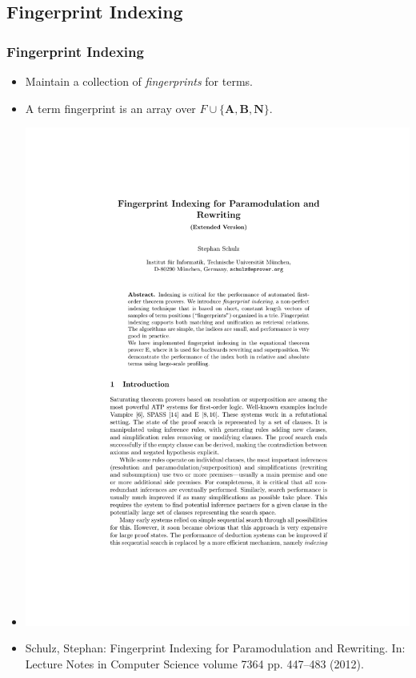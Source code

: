\documentclass[10pt]{beamer}
\begin{document}
\begin{NoHyper}
\subsection{Fingerprint Indexing} 
\begin{frame}
  \frametitle{Fingerprint Indexing}
  \begin{itemize}
  \item<1-> Maintain a collection of \emph{fingerprints} for terms.
  \item<2-> A term fingerprint is an array over $F \cup \{\mathbf{A, B, N}\}$.
  \item<3-> \includegraphics[page=6,scale=0.7,trim=5.5cm 20.5cm 5cm 4cm,clip]{schulz_fp-index_ext}
  \item<4-> {\footnotesize Schulz, Stephan: Fingerprint Indexing for Paramodulation and Rewriting. In:
  Lecture Notes in Computer Science volume 7364 pp. 447--483 (2012).}

  \end{itemize}
\end{frame}


\end{NoHyper}
\end{document}

